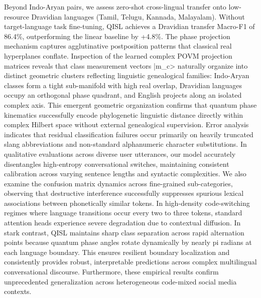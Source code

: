 \documentclass[10pt,twocolumn,letterpaper]{article}
\theoremstyle{definition}
\begin{document}
Beyond Indo-Aryan pairs, we assess zero-shot cross-lingual transfer onto low-resource Dravidian languages (Tamil, Telugu, Kannada, Malayalam). Without target-language task fine-tuning, QISL achieves a Dravidian transfer Macro-F1 of 86.4\%, outperforming the linear baseline by +4.8\%. The phase projection mechanism captures agglutinative postposition patterns that classical real hyperplanes conflate. Inspection of the learned complex POVM projection matrices reveals that class measurement vectors |m\_c> naturally organize into distinct geometric clusters reflecting linguistic genealogical families: Indo-Aryan classes form a tight sub-manifold with high real overlap, Dravidian languages occupy an orthogonal phase quadrant, and English projects along an isolated complex axis. This emergent geometric organization confirms that quantum phase kinematics successfully encode phylogenetic linguistic distance directly within complex Hilbert space without external genealogical supervision. Error analysis indicates that residual classification failures occur primarily on heavily truncated slang abbreviations and non-standard alphanumeric character substitutions. In qualitative evaluations across diverse user utterances, our model accurately disentangles high-entropy conversational switches, maintaining consistent calibration across varying sentence lengths and syntactic complexities. We also examine the confusion matrix dynamics across fine-grained sub-categories, observing that destructive interference successfully suppresses spurious lexical associations between phonetically similar tokens. In high-density code-switching regimes where language transitions occur every two to three tokens, standard attention heads experience severe degradation due to contextual diffusion. In stark contrast, QISL maintains sharp class separation across rapid alternation points because quantum phase angles rotate dynamically by nearly pi radians at each language boundary. This ensures resilient boundary localization and consistently provides robust, interpretable predictions across complex multilingual conversational discourse. Furthermore, these empirical results confirm unprecedented generalization across heterogeneous code-mixed social media contexts.
\end{document}
